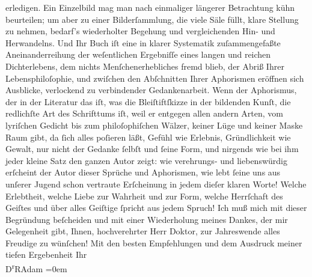 \begin{ledgroupsized}[t]{13cm}
               erledigen. Ein Einzelbild mag man nach einmaliger längerer Betrachtung {\pb}kühn beurteilen; um aber zu einer
               Bilderſammlung, die viele Säle füllt, klare Stellung zu nehmen, bedarf’s wiederholter
               Begehung und vergleichenden Hin- und Herwandelns. Und Ihr Buch iſt eine in klarer
               Systematik zuſammengefaßte Aneinanderreihung der weſentlichen Ergebniſſe eines langen
               und reichen Dichterlebens, dem nichts Menſchenerhebliches fremd blieb, der Abriß
               Ihrer Lebensphiloſophie, und zwiſchen den Abſchnitten Ihrer Aphorismen eröffnen sich
               Ausblicke, verlockend zu verbindender Gedankenarbeit. Wenn der Aphorismus, der in der
               Literatur das iſt, was die Bleiſtiftſkizze in der bildenden Kunſt, die redlichſte Art
               des Schrifttums iſt, weil er entgegen allen andern Arten, vom lyriſchen Gedicht bis
               zum philoſophiſchen Wälzer, keiner Lüge und keiner Maske Raum  gibt, {\pb}da ſich alles poſieren läßt, Gefühl wie Erlebnis, Gründlichkeit wie Gewalt, nur
               nicht der Gedanke ſelbſt und ſeine Form, und nirgends wie bei ihm jeder kleine Satz
               den ganzen Autor zeigt: wie verehrungs- und liebenswürdig erſcheint der Autor dieser
               Sprüche und Aphorismen, wie lebt ſeine uns aus unſerer Jugend schon vertraute
               Erſcheinung in jedem dieſer klaren Worte! Welche Erlebtheit, welche Liebe zur
               Wahrheit und zur Form, welche Herrſchaft des Geiſtes und über alles Geiſtige ſpricht
               aus jedem Spruch!\pend
           \pstart
           Ich muß mich mit dieser Begründung beſcheiden und mit einer Wiederholung meines
               Dankes, der mir Gelegenheit gibt, Ihnen, hochverehrter Herr Doktor, zur Jahreswende
               alles Freudige zu wünſchen!\pend
           \pstart
           Mit den besten Empfehlungen und {\pb}dem
               Ausdruck meiner tiefen Ergebenheit\pend
           \pstart
           Ihr{\\[\baselineskip]}\spacefill\mbox{D\textsuperscript{r}RAdam}\pend
           \leftskip=0em{}
         
         \endnumbering{}\end{ledgroupsized}  \newcommand{\dateiname}{L02497}\newcommand{\titel}{Robert Adam an Arthur Schnitzler, 30. 12. 1927}\newcommand{\editorInnen}{Martin Anton Müller und Gerd-Hermann Susen}
      
